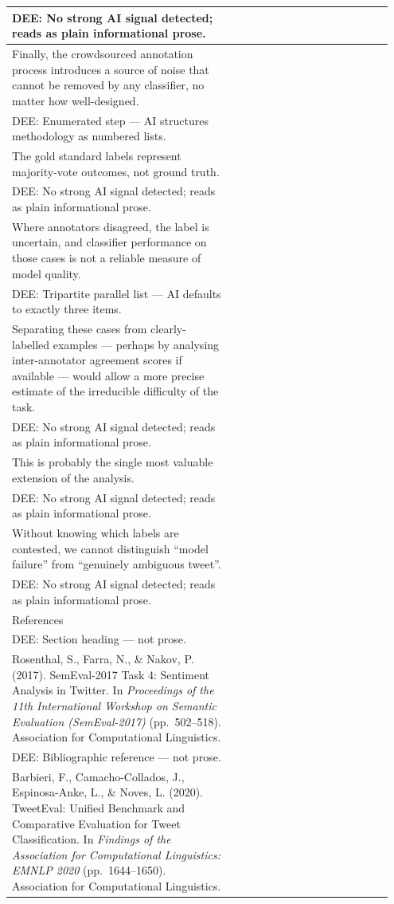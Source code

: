 \documentclass[11pt]{article}
\begin{document}
\begin{longtable}{|p{0.55\linewidth}|p{0.40\linewidth}|}
\hline
DEE: No strong AI signal detected; reads as plain informational prose. & \\
\hline
Finally, the crowdsourced annotation process introduces a source of noise that cannot be removed by any classifier, no matter how well-designed. & \\[2pt]
\hline
DEE: Enumerated step --- AI structures methodology as numbered lists. & \\
\hline
The gold standard labels represent majority-vote outcomes, not ground truth. & \\[2pt]
\hline
DEE: No strong AI signal detected; reads as plain informational prose. & \\
\hline
Where annotators disagreed, the label is uncertain, and classifier performance on those cases is not a reliable measure of model quality. & \\[2pt]
\hline
DEE: Tripartite parallel list --- AI defaults to exactly three items. & \\
\hline
Separating these cases from clearly-labelled examples --- perhaps by analysing inter-annotator agreement scores if available --- would allow a more precise estimate of the irreducible difficulty of the task. & \\[2pt]
\hline
DEE: No strong AI signal detected; reads as plain informational prose. & \\
\hline
This is probably the single most valuable extension of the analysis. & \\[2pt]
\hline
DEE: No strong AI signal detected; reads as plain informational prose. & \\
\hline
Without knowing which labels are contested, we cannot distinguish ``model failure'' from ``genuinely ambiguous tweet''. & \\[2pt]
\hline
DEE: No strong AI signal detected; reads as plain informational prose. & \\
\hline
References & \\[2pt]
\hline
DEE: Section heading --- not prose. & \\
\hline
Rosenthal, S., Farra, N., \& Nakov, P. (2017). SemEval-2017 Task 4: Sentiment Analysis in Twitter. In \textit{Proceedings of the 11th International Workshop on Semantic Evaluation (SemEval-2017)} (pp.\ 502--518). Association for Computational Linguistics. & \\[2pt]
\hline
DEE: Bibliographic reference --- not prose. & \\
\hline
Barbieri, F., Camacho-Collados, J., Espinosa-Anke, L., \& Noves, L. (2020). TweetEval: Unified Benchmark and Comparative Evaluation for Tweet Classification. In \textit{Findings of the Association for Computational Linguistics: EMNLP 2020} (pp.\ 1644--1650). Association for Computational Linguistics. & \\[2pt]

\end{longtable}
\end{document}

